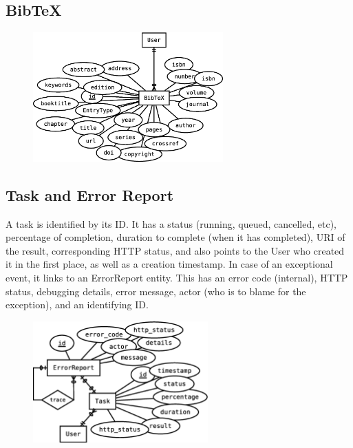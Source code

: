 \subsection{BibTeX}
\lipsum[1]

\begin{figure}[h]
 \centering
 \includegraphics[keepaspectratio=true,width=0.65\textwidth]{figures/bibtex}
\end{figure}

\subsection{Task and Error Report}
A task is identified by its ID. It has a status (running, queued,
cancelled, etc), percentage of completion, duration to complete (when
it has completed), URI of the result, corresponding HTTP status, 
and also points to the User who created it in the first place, 
as well as a creation timestamp. In case of an exceptional 
event, it links to an ErrorReport entity. This has an error code
(internal), HTTP status, debugging details, error message, 
actor (who is to blame for the exception), and an identifying ID.

\begin{figure}[h]
 \centering
 \includegraphics[keepaspectratio=true,width=0.6\textwidth]{figures/task_error}
\end{figure}


